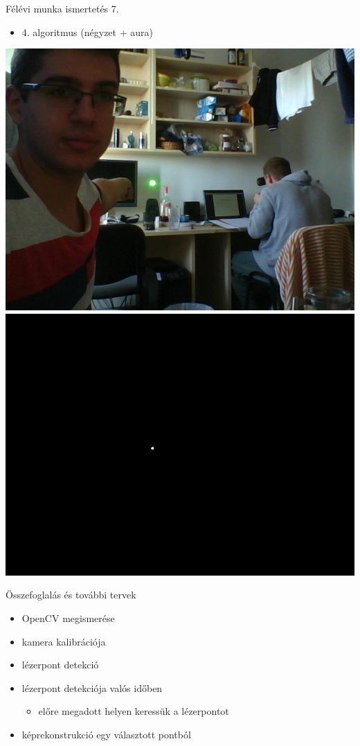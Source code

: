 \documentclass[17pt,xcolor=x11names]{beamer}
\begin{document}
\begin{frame}{Félévi munka ismertetés 7.}
\begin{itemize}
\item 4. algoritmus (négyzet + aura)
\end{itemize}
\begin{center}
\includegraphics[scale=0.225]{figs/laser.png}
\hspace{20pt}
\includegraphics[scale=0.225]{figs/laser4-b.png}
\end{center}
\end{frame}

\begin{frame}{Összefoglalás és további tervek}
\begin{itemize}
\item OpenCV megismerése
\item kamera kalibrációja
\item lézerpont detekció\\\vspace{20pt}
\item lézerpont detekciója valós időben
\begin{itemize}
\item előre megadott helyen keressük a lézerpontot
\end{itemize}
\item képrekonstrukció egy választott pontból
\end{itemize}
\end{frame}
\end{document}
